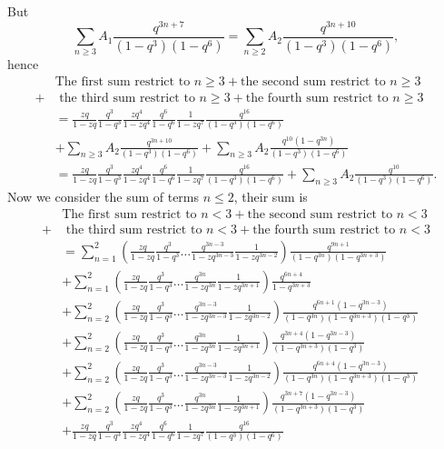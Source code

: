 \documentclass[draft]{amsart}
\numberwithin{equation}{section}
\theoremstyle{plain}
\theoremstyle{remark}
\begin{document}
But 
$$
\sum_{n\geq 3}A_{1}\frac{q^{3n+7}}{(1-q^{3})(1-q^{6})}=\sum_{n\geq 2}A_{2}\frac{q^{3n+10}}{(1-q^{3})(1-q^{6})},
$$
hence 
\begin{align}
&\mbox{The first sum restrict to } n\geq 3 + \mbox{the second sum restrict to }n\geq 3\nonumber\\
  +&\mbox{ the third sum restrict to } n\geq3+\mbox{the fourth sum restrict to }n\geq 3\nonumber\\
 &= \frac{zq}{1-zq}\frac{q^{3}}{1-q^{3}}\frac{zq^{4}}{1-zq^{4}}\frac{q^{6}}{1-q^{6}}\frac{1}{1-zq^{7}}\frac{q^{16}}{(1-q^{3})(1-q^{6})} \nonumber\\
 &+\sum_{n\geq 3}A_{2}\frac{q^{3n+10}}{(1-q^{3})(1-q^{6})} +\sum_{n\geq 3}A_{2}\frac{q^{10}(1-q^{3n})}{(1-q^{3})(1-q^{6})} \nonumber\\
 &= \frac{zq}{1-zq}\frac{q^{3}}{1-q^{3}}\frac{zq^{4}}{1-zq^{4}}\frac{q^{6}}{1-q^{6}}\frac{1}{1-zq^{7}}\frac{q^{16}}{(1-q^{3})(1-q^{6})}+\sum_{n\geq 3}A_{2}\frac{q^{10}}{(1-q^{3})(1-q^{6})}.\label{3.23}
 \end{align}
 Now we consider the sum of  terms $n\leq 2$, their sum is 
 \begin{align*}
&\mbox{The first sum restrict to } n<3 + \mbox{the second sum restrict to }n<3\\
  +&\mbox{ the third sum restrict to } n<3+\mbox{the fourth sum restrict to }n<3\\
&=\sum_{n=1}^{2}\left(\frac{zq}{1-zq}\frac{q^{3}}{1-q^{3}}\dots\frac{q^{3n-3}}{1-zq^{3n-3}}\frac{1}{1-zq^{3n-2}}\right)\frac{q^{9n+1}}{(1-q^{3n})(1-q^{3n+3})}     \\
&+\sum_{n=1}^{2}\left(\frac{zq}{1-zq}\frac{q^{3}}{1-q^{3}}\dots\frac{q^{3n}}{1-zq^{3n}}\frac{1}{1-zq^{3n+1}}\right)\frac{q^{6n+4}}{1-q^{3n+3}}\\
&+\sum_{n=2}^{2}\left(\frac{zq}{1-zq}\frac{q^{3}}{1-q^{3}}\dots\frac{q^{3n-3}}{1-zq^{3n-3}}\frac{1}{1-zq^{3n-2}}\right)\frac{q^{6n+1}(1-q^{3n-3})}{(1-q^{3n})(1-q^{3n+3})(1-q^{3})}  \\
&+\sum_{n=2}^{2}\left(\frac{zq}{1-zq}\frac{q^{3}}{1-q^{3}}\dots\frac{q^{3n}}{1-zq^{3n}}\frac{1}{1-zq^{3n+1}}\right)\frac{q^{3n+4}(1-q^{3n-3})}{(1-q^{3n+3})(1-q^{3})}  \\
&+\sum_{n=2}^{2}\left(\frac{zq}{1-zq}\frac{q^{3}}{1-q^{3}}\dots\frac{q^{3n-3}}{1-zq^{3n-3}}\frac{1}{1-zq^{3n-2}}\right)\frac{q^{6n+4}(1-q^{3n-3})}{(1-q^{3n})(1-q^{3n+3})(1-q^{3})}  \\
&+\sum_{n=2}^{2}\left(\frac{zq}{1-zq}\frac{q^{3}}{1-q^{3}}\dots\frac{q^{3n}}{1-zq^{3n}}\frac{1}{1-zq^{3n+1}}\right)\frac{q^{3n+7}(1-q^{3n-3})}{(1-q^{3n+3})(1-q^{3})}\\
&+\frac{zq}{1-zq}\frac{q^{3}}{1-q^{3}}\frac{zq^{4}}{1-zq^{4}}\frac{q^{6}}{1-q^{6}}\frac{1}{1-zq^{7}}\frac{q^{16}}{(1-q^{3})(1-q^{6})}
 \end{align*}
\end{document}
